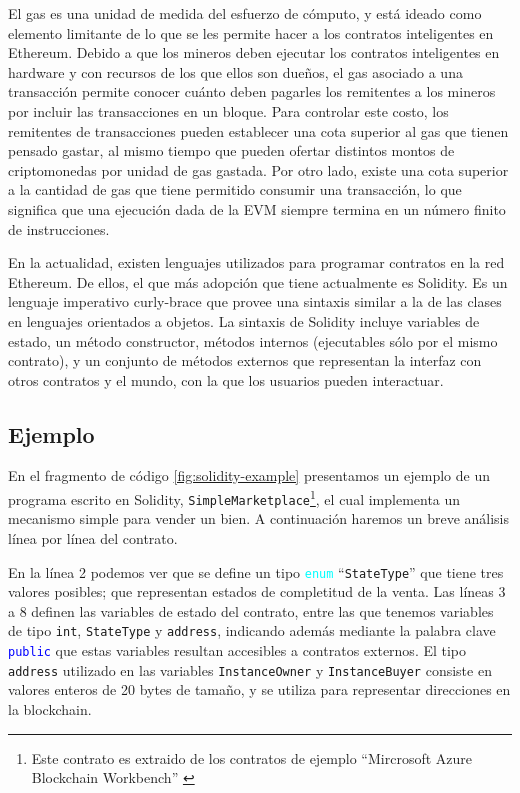 El gas es una unidad de medida del esfuerzo de cómputo, y está ideado como elemento limitante de lo que se les permite hacer a los contratos inteligentes en Ethereum.
Debido a que los mineros deben ejecutar los contratos inteligentes en hardware y con recursos de los que ellos son dueños, el gas asociado a una transacción permite conocer cuánto deben pagarles los remitentes a los mineros por incluir las transacciones en un bloque.
Para controlar este costo, los remitentes de transacciones pueden establecer una cota superior al gas que tienen pensado gastar, al mismo tiempo que pueden ofertar distintos montos de criptomonedas por unidad de gas gastada.
Por otro lado, existe una cota superior a la cantidad de gas que tiene permitido consumir una transacción, lo que significa que una ejecución dada de la EVM siempre termina en un número finito de instrucciones.

En la actualidad, existen lenguajes utilizados para programar contratos en la red Ethereum.
De ellos, el que más adopción que tiene actualmente es Solidity.
Es un lenguaje imperativo curly-brace que provee una sintaxis similar a la de las clases en lenguajes orientados a objetos.
La sintaxis de Solidity incluye variables de estado, un método constructor, métodos internos (ejecutables sólo por el mismo contrato), y  un conjunto de métodos externos que representan la interfaz con otros contratos y el mundo, con la que los usuarios pueden interactuar.

\subsection{Ejemplo}
En el fragmento de código \ref{fig:solidity-example} presentamos un ejemplo de un programa escrito en Solidity, \texttt{SimpleMarketplace}\footnote{Este contrato es extraido de los contratos de ejemplo ``Mircrosoft Azure Blockchain Workbench'' \cite{azure-benchmark}}, el cual implementa un mecanismo simple para vender un bien.
A continuación haremos un breve análisis línea por línea del contrato.

En la línea 2 podemos ver que se define un tipo \textcolor{cyan}{\texttt{enum}} ``\texttt{StateType}'' que tiene tres valores posibles; que representan estados de completitud de la venta.
Las líneas 3 a 8 definen las variables de estado del contrato, entre las que tenemos variables de tipo \texttt{int}, \texttt{StateType} y \texttt{address}, indicando además mediante la palabra clave \textcolor{blue}{\texttt{public}} que estas variables resultan accesibles a contratos externos.
El tipo \texttt{address} utilizado en las variables \texttt{InstanceOwner} y \texttt{InstanceBuyer} consiste en valores enteros de 20 bytes de tamaño, y se utiliza para representar direcciones en la blockchain.

